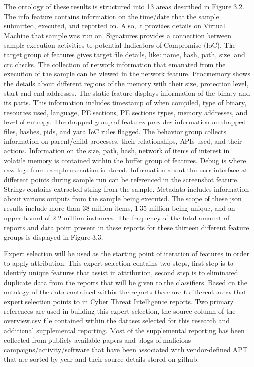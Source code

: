 \documentclass[12pt]{report}
\begin{document}
The ontology of these results is structured into 13 areas described in Figure 3.2.  The info feature contains information on the time/date that the sample submitted, executed, and reported on.  Also, it provides details on Virtual Machine that sample was run on.  Signatures provides a connection between sample execution activities to potential Indicators of Compromise (IoC).  The target group of features gives target file details, like: name, hash, path, size, and crc checks.  The collection of network information that emanated from the execution of the sample can be viewed in the network feature.  Procmemory shows the details about different regions of the memory with their size, protection level, start and end addresses.  The static feature displays information of the binary and its parts.  This information includes timestamp of when compiled, type of binary, resources used, language, PE sections, PE sections types, memory addresses, and level of entropy.  The dropped group of features provides information on dropped files, hashes, pids, and yara IoC rules flagged.  The behavior group collects information on parent/child processes, their relationships, APIs used, and their actions.  Information on the size, path, hash, network of items of interest in volatile memory is contained within the buffer group of features.  Debug is where raw logs from sample execution is stored.  Information about the user interface at different points during sample run can be referenced in the screenshot feature.  Strings contains extracted string from the sample.  Metadata includes information about various outputs from the sample being executed.  The scope of these json results include more than 38 million items, 1.35 million being unique, and an upper bound of 2.2 million instances.  The frequency of the total amount of reports and data point present in these reports for these thirteen different feature groups is displayed in Figure 3.3.

Expert selection will be used as the starting point of iteration of features in order to apply attribution.  This expert selection contains two steps, first step is to identify unique features that assist in attribution, second step is to eliminated duplicate data from the reports that will be given to the classifiers.  Based on the ontology of the data contained within the reports there are 6 different areas that expert selection points to in Cyber Threat Intelligence reports.  Two primary references are used in building this expert selection, the source column of the overview.csv file contained within the dataset selected for this research and additional supplemental reporting.  Most of the supplemental reporting has been collected from publicly-available papers and blogs of malicious campaigns/activity/software that have been associated with vendor-defined APT that are sorted by year and their source details stored on github. \cite{APTnotes}  
\end{document}
